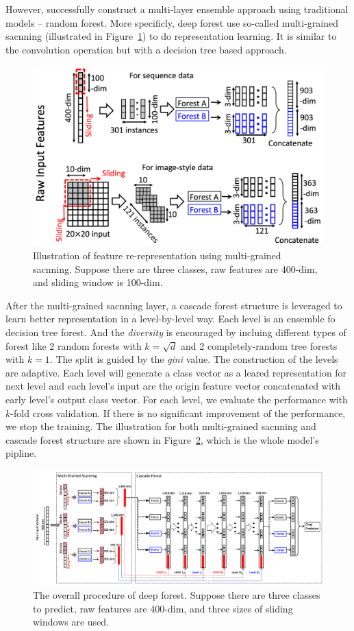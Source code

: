 \documentclass[sigconf]{acmart}
\begin{document}
	However, \citet{zhou2017deep} successfully construct a multi-layer ensemble approach using traditional models -- random forest. More specificly, deep forest use so-called multi-grained sacnning (illustrated in Figure~\ref{fig:multi-grained-scanning}) to do representation learning. It is similar to the convolution operation but with a decision tree based approach. 
	\begin{figure}[h]
	\centering
	\includegraphics[width=0.8\linewidth]{../figs/multi-grained-scanning}
	\caption{ Illustration of feature re-representation using multi-grained sacnning. Suppose there are three classes, raw features are 400-dim, and sliding window is 100-dim.}
	\label{fig:multi-grained-scanning}
	\end{figure}
	
	After the multi-grained sacnning layer, a cascade forest structure is leveraged to learn better representation in a level-by-level way. Each level is an ensemble fo decision tree forest. And the \textit{diversity} is encouraged by incluing different types of forest like 2 random forests with $k=\sqrt{d}$ and 2 completely-random tree forests with $k=1$. The split is guided by the \textit{gini} value. The construction of the levels are adaptive. Each level will generate a class vector as a leared representation for next level and each level's input are the origin feature vector concatenated with early level's output class vector. For each level, we evaluate the performance with $k$-fold cross validation. If there is no significant improvement of the performance, we stop the training. The illustration for both multi-grained sacnning and cascade forest structure are shown in Figure~\ref{fig:deep-forest}, which is the whole model's pipline. 
	
	
\begin{figure}[h]
\centering
\includegraphics[width=0.9\linewidth]{../figs/deep-forest}
\caption{The overall procedure of deep forest. Suppose there are three classes to predict, raw features are 400-dim, and three sizes of sliding windows are used.}
\label{fig:deep-forest}
\end{figure}
	
\end{document}
